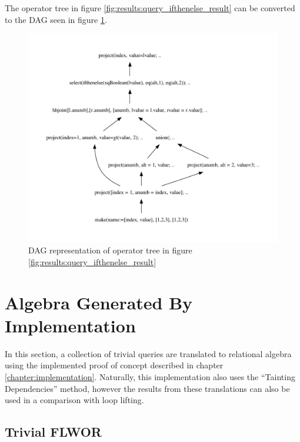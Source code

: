 The operator tree in figure \ref{fig:results:query_ifthenelse_result} can be
converted to the DAG seen in figure \ref{fig:results:query_ifthenelse_result_dag}.

\newpage

\begin{figure}[!htp]
\begin{center}
  \includegraphics[width=1.0\textwidth]{img/graphs/ifthenelse_dag}
  \caption{DAG representation of operator tree in figure
  \ref{fig:results:query_ifthenelse_result}}
  \label{fig:results:query_ifthenelse_result_dag}
\end{center}
\end{figure}

\newpage

\section{Algebra Generated By Implementation}
\label{sect:result:implementation_algebra}
In this section, a collection of trivial queries are translated to relational
algebra using the implemented proof of concept described in chapter
\ref{chapter:implementation}. Naturally, this implementation also uses the
``Tainting Dependencies'' method, however the results from these translations
can also be used in a comparison with loop lifting.

\subsection{Trivial FLWOR}
